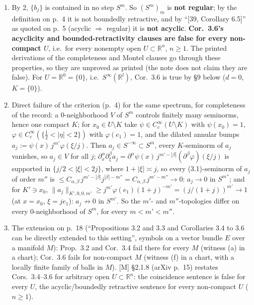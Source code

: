 \documentclass[11pt]{article}
\newcommand{\R}{\mathbb{R}}
\begin{document}
\begin{enumerate}
\begin{itemize}
\end{itemize}
For the finitely many $j<j_0$, $b_j\in\lambda_jW$ since $W$ is absorbing. So $\{b_j\}\subset\lambda W$ with $\lambda:=\max\{1,\lambda_j\}$: \textbf{bounded in $S^\infty$.}
\item By 2, $\{b_j\}$ is contained in no step $S^m$. So $(S^m)_m$ is \textbf{not regular}; by the definition on p.~4 it is not boundedly retractive, and by ``[39, Corollary 6.5]'' as quoted on p.~5 (acyclic $\Rightarrow$ regular) it is \textbf{not acyclic}. \textbf{Cor.~3.6's acyclicity and bounded-retractivity clauses are false for every non-compact $U$}, i.e.\ for every nonempty open $U\subset\R^n$, $n\ge1$. The printed derivations of the completeness and Montel clauses go through these properties, so they are unproved as printed (the note does not claim they are false). For $U=\R^0=\{0\}$, i.e.\ $S^\infty(\R^l)$, Cor.~3.6 is true by \S9 below ($d=0$, $K=\{0\}$).
\item Direct failure of the criterion (p.~4) for the same spectrum, for completeness of the record: a 0-neighborhood $V$ of $S^m$ controls finitely many seminorms, hence one compact $K$; for $x_0\in U\setminus K$ take $\psi\in C_c^\infty(U\setminus K)$ with $\psi(x_0)=1$, $\varphi\in C_c^\infty(\{\tfrac12<|\eta|<2\})$ with $\varphi(e_1)=1$, and the dilated annular bumps $a_j:=\psi(x)\,j^{m'}\varphi(\xi/j)$. Then $a_j\in S^{-\infty}\subset S^m$, every $K$-seminorm of $a_j$ vanishes, so $a_j\in V$ for all $j$; $\partial^\alpha_x\partial^\beta_\xi a_j=\partial^\alpha\psi(x)\,j^{m'-|\beta|}(\partial^\beta\varphi)(\xi/j)$ is supported in $\{j/2<|\xi|<2j\}$, where $1+|\xi|\asymp j$, so every (3.1)-seminorm of $a_j$ of order $m''$ is $\le C_{\alpha,\beta}\,j^{m'-|\beta|}j^{|\beta|-m''}=C_{\alpha,\beta}\,j^{m'-m''}\to0$: $a_j\to0$ in $S^{m''}$; and for $K'\ni x_0$, $\|a_j\|_{K',0,0,m'}\ge j^{m'}\varphi(e_1)(1+j)^{-m'}=(j/(1+j))^{m'}\to1$ (at $x=x_0$, $\xi=je_1$): $a_j\not\to0$ in $S^{m'}$. So the $m'$- and $m''$-topologies differ on every 0-neighborhood of $S^m$, for every $m<m'<m''$.
\item The extension on p.~18 (``Propositions 3.2 and 3.3 and Corollaries 3.4 to 3.6 can be directly extended to this setting'', symbols on a vector bundle $E$ over a manifold $M$): Prop.~3.2 and Cor.~3.4 fail there for every $M$ (witness (a) in a chart); Cor.~3.6 fails for non-compact $M$ (witness (f) in a chart, with a locally finite family of balls in $M$). [M] \S2.1.8 (arXiv p.~15) restates Cors.~3.4--3.6 for arbitrary open $U\subset\R^n$: the coincidence sentence is false for every $U$, the acyclic/boundedly retractive sentence for every non-compact $U$ ($n\ge1$).
\end{enumerate}
\end{document}
